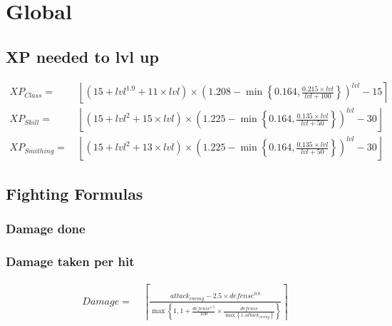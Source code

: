 \chapter{Global}
    \section{XP needed to lvl up}
        \begin{align*}
            XP_{Class} = &\ 
                \left\lfloor
                \left( 15+{lvl}^{1.9}+11 \times lvl \right)
                \times 
                \left( 1.208 - \min \left\{ 0.164,\frac{0.215\times {lvl}}{{lvl} + 100} \right\} \right)^{lvl}-15
                \right\rceil
            \\ 
            XP_{Skill} =  &\
                \left\lfloor
                \left( 15+{lvl}^{2}+15\times lvl \right)
                \times 
                \left( 1.225 - \min \left\{ 0.164,\frac{0.135\times {lvl}}{{lvl} + 50} \right\} \right)^{lvl}-30
                \right\rfloor
            \\ 
            XP_{Smithing} =  &\
                \left\lfloor
                \left( 15+{lvl}^{2}+13\times lvl \right)
                \times 
                \left( 1.225 - \min \left\{ 0.164,\frac{0.135\times {lvl}}{{lvl} + 50} \right\} \right)^{lvl}-30
                \right\rfloor
        \end{align*}

    \section{Fighting Formulas}
        \subsection{Damage done}

        \subsection{Damage taken per hit}
            \begin{align*}
                Damage = &\
                    \left\lceil
                    \frac{ {attack}_{enemy} - 2.5 \times {defense}^{0.8} }
                        { \max \left\{1,1+ \frac{ {defense}^{1.5}}
                            {100} 
                        \times \frac{ {defense} }
                            { {\max \left\{1,{attack}_{enemy} \right\}} }\right\}
                        }
                    \right\rceil
            \end{align*}